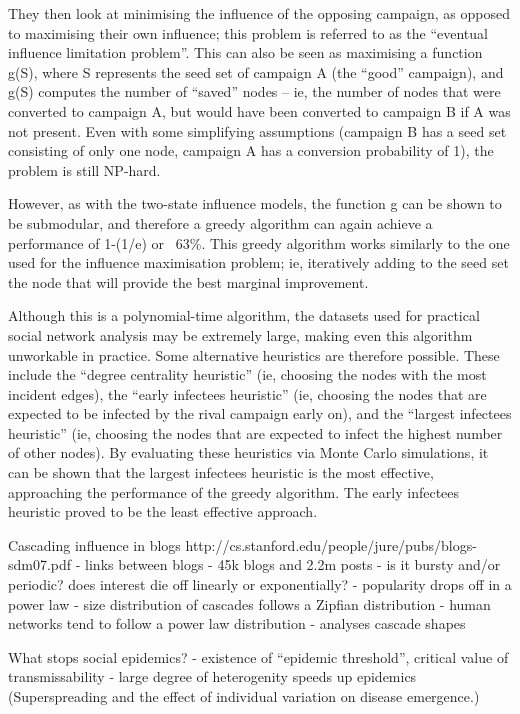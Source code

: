 They then look at minimising the influence of the opposing campaign, as opposed to maximising their own influence; this problem is referred to as the ``eventual influence limitation problem''. This can also be seen as maximising a function g(S), where S represents the seed set of campaign A (the ``good'' campaign), and g(S) computes the number of ``saved'' nodes -- ie, the number of nodes that were converted to campaign A, but would have been converted to campaign B if A was not present. Even with some simplifying assumptions (campaign B has a seed set consisting of only one node, campaign A has a conversion probability of 1), the problem is still NP-hard.

However, as with the two-state influence models, the function g can be shown to be submodular, and therefore a greedy algorithm can again achieve a performance of 1-(1/e) or ~63\%. This greedy algorithm works similarly to the one used for the influence maximisation problem; ie, iteratively adding to the seed set the node that will provide the best marginal improvement.

Although this is a polynomial-time algorithm, the datasets used for practical social network analysis may be extremely large, making even this algorithm unworkable in practice. Some alternative heuristics are therefore possible. These include the ``degree centrality heuristic'' (ie, choosing the nodes with the most incident edges), the ``early infectees heuristic'' (ie, choosing the nodes that are expected to be infected by the rival campaign early on), and the ``largest infectees heuristic'' (ie, choosing the nodes that are expected to infect the highest number of other nodes). By evaluating these heuristics via Monte Carlo simulations, it can be shown that the largest infectees heuristic is the most effective, approaching the performance of the greedy algorithm. The early infectees heuristic proved to be the least effective approach.


Cascading influence in blogs
http://cs.stanford.edu/people/jure/pubs/blogs-sdm07.pdf
- links between blogs
- 45k blogs and 2.2m posts
- is it bursty and/or periodic? does interest die off linearly or exponentially?
- popularity drops off in a power law
- size distribution of cascades follows a Zipfian distribution
- human networks tend to follow a power law distribution
- analyses cascade shapes

What stops social epidemics?
- existence of ``epidemic threshold'', critical value of transmissability
- large degree of heterogenity speeds up epidemics (Superspreading and the effect of individual variation on disease emergence.)

